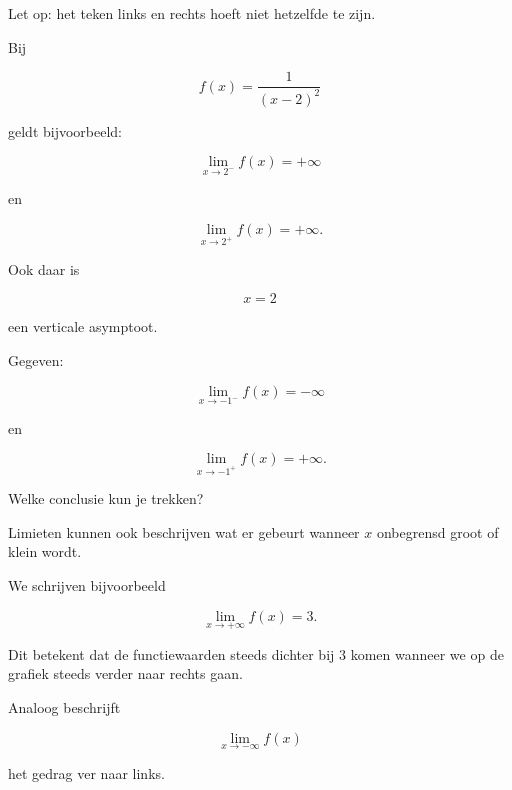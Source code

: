 \documentclass{ximera}
\begin{document}
Let op: het teken links en rechts hoeft niet hetzelfde te zijn.

Bij

\[
f(x)=\frac{1}{(x-2)^2}
\]

geldt bijvoorbeeld:

\[
\lim_{x\to2^-}f(x)=+\infty
\]

en

\[
\lim_{x\to2^+}f(x)=+\infty.
\]

Ook daar is

\[
x=2
\]

een verticale asymptoot.



\begin{oefening}{\oefB\ESS}

Gegeven:

\[
\lim_{x\to-1^-}f(x)=-\infty
\]

en

\[
\lim_{x\to-1^+}f(x)=+\infty.
\]

Welke conclusie kun je trekken?

\begin{multipleChoice}
\end{multipleChoice}

\end{oefening}




Limieten kunnen ook beschrijven wat er gebeurt wanneer $x$
onbegrensd groot of klein wordt.

We schrijven bijvoorbeeld

\[
\lim_{x\to+\infty}f(x)=3.
\]

Dit betekent dat de functiewaarden steeds dichter bij $3$ komen
wanneer we op de grafiek steeds verder naar rechts gaan.

Analoog beschrijft

\[
\lim_{x\to-\infty}f(x)
\]

het gedrag ver naar links.
\end{document}

